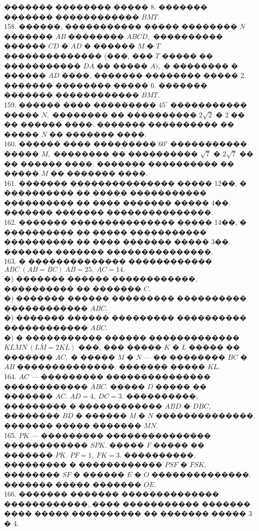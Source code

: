 \documentclass[12pt]{article}
\begin{document}
������� �������� ����� 8. ������� ������� ������������ $BMT.$\\
158. ������, ����������� ����� �������� $N$ ������� $AB$ �������� $ABCD,$ ���������� ������ $CD$ �
$AD$ � ������ $M$ � $T$ �������������� (���, ��� $T$ ����� �� ����������� $DA$ �� ����� $A),$ �
�������� � ������ $AD$ ����, ������� �������� ����� 2. ������� �������� ����� 6. ������� ������� ������������ $BMT.$\\
159. ������ ���� ��������� $45^\circ$ ����������� ����� $N,$ �������� �� ���������� $2\sqrt{2}$ � 2 �� �� ������ ����.
������� ���������� �� ����� $N$ �� ������� ����.\\
160. ������ ���� ��������� $60^\circ$ ����������� ����� $M,$ �������� �� ���������� $\sqrt{7}$ � $2\sqrt{7}$ �� ��
������ ����. ������� ���������� �� ����� $M$ �� ������� ����.\\
161. ������� ��������������� ����� 12��, � ���������� �� ����� ����������� ���������� �� ���� ������� ����� 4��. ������� ������� ���������������.\\
162. ������� ��������������� ����� 14��, � ���������� �� ����� ����������� ���������� �� ���� ������� ����� 3��. ������� ������� ���������������.\\
163. � �������������� ������������ $ABC\ (AB=BC)\ AB=25,\ AC=14.$\\
�) ������� ������ ������������, ���������� �� ������� $C.$\\
�) ������� ������ ��������� ���������� ������������ $ABC.$\\
�) ������� ������ ��������� ���������� ������������ $ABC.$\\
�) � ����������� ������ ������������� $KLMN\ (LM=2KL)$ ���, ��� ����� $K$ � $L$ ����� �� ������� $AC,$ � ����� $M$ � $N$ --- �� �������� $BC$ � $AB$ ��������������. ������� ����� $KL.$\\
164. $AC$ --- ��������� ��������������� ������������ $ABC.$ ����� $D$ ����� �� ������� $AC.$ $AD=4,\ DC=3.$ ����������, ��������� � ������������ $ABD$ � $DBC,$ �������� $BD$ � ������ $M$ � $N$ ��������������. ������� ����� ������� $MN.$\\
165. $PK$ --- ��������� ��������������� ������������ $SPK.$ ����� $F$ ����� �� ������� $PK.$ $PF=1,\ FK=3.$ ����������, ��������� � ������������ $PSF$ � $FSK,$ �������� $SF$ � ������ $E$ � $O$ ��������������. ������� ����� ������� $OE.$\\
166. ������� ������� �������������� ������������, ���� ����������� ������� ���� ����� ���������� �� ������� ����� 3 � 4.\\
\end{document}
